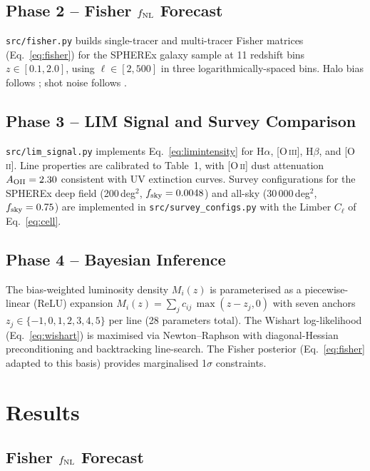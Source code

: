 \documentclass[12pt]{article}
\begin{document}
\subsection{Phase 2 -- Fisher $f_{\rm NL}$ Forecast}

\texttt{src/fisher.py} builds single-tracer and multi-tracer Fisher matrices
(Eq.~\ref{eq:fisher}) for the SPHEREx galaxy sample at 11 redshift bins
$z \in [0.1, 2.0]$, using $\ell \in [2, 500]$ in three logarithmically-spaced
bins.  Halo bias follows \citet{ShethMoTormen2001}; shot noise follows
\citet{ShethTormen1999}.

\subsection{Phase 3 -- LIM Signal and Survey Comparison}

\texttt{src/lim\_signal.py} implements Eq.~\ref{eq:limintensity} for H$\alpha$,
[O\,\textsc{iii}], H$\beta$, and [O\,\textsc{ii}].  Line properties are
calibrated to \citet{Cheng2024} Table~1, with [O\,\textsc{ii}] dust
attenuation $A_{\rm OII} = 2.30$ consistent with UV extinction curves.
Survey configurations for the SPHEREx deep field (200\,deg$^2$, $f_{\rm sky}
= 0.0048$) and all-sky (30\,000\,deg$^2$, $f_{\rm sky} = 0.75$) are
implemented in \texttt{src/survey\_configs.py} with the Limber
$C_\ell$ of Eq.~\ref{eq:cell}.

\subsection{Phase 4 -- Bayesian Inference}

The bias-weighted luminosity density $M_i(z)$ is parameterised as a
piecewise-linear (ReLU) expansion
$M_i(z) = \sum_j c_{ij}\,\max(z - z_j, 0)$
with seven anchors $z_j \in \{-1,0,1,2,3,4,5\}$ per line (28 parameters
total).  The Wishart log-likelihood (Eq.~\ref{eq:wishart}) is maximised via
Newton--Raphson with diagonal-Hessian preconditioning and backtracking
line-search.  The Fisher posterior (Eq.~\ref{eq:fisher} adapted to this basis)
provides marginalised 1$\sigma$ constraints.

\section{Results}
\label{sec:results}

\subsection{Fisher $f_{\rm NL}$ Forecast}
\end{document}
